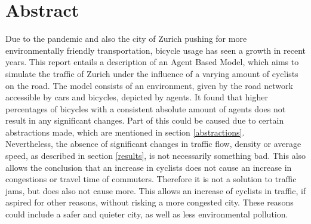 \section{Abstract}
Due to the pandemic and also the city of Zurich pushing for more environmentally friendly transportation, bicycle usage has seen a growth in recent years. This report entails a description of an Agent Based Model, which aims to simulate the traffic of Zurich under the influence of a varying amount of cyclists on the road. The model consists of an environment, given by the road network accessible by cars and bicycles, depicted by agents. It found that higher percentages of bicycles with a consistent absolute amount of agents does not result in any significant changes. Part of this could be caused due to certain abstractions made, which are mentioned in section \ref{abstractions}.\\
Nevertheless, the absence of significant changes in traffic flow, density or average speed, as described in section \ref{results}, is not necessarily something bad. This also allows the conclusion that an increase in cyclists does not cause an increase in congestions or travel time of commuters. Therefore it is not a solution to traffic jams, but does also not cause more. This allows an increase of cyclists in traffic, if aspired for other reasons, without risking a more congested city. These reasons could include a safer and quieter city, as well as less environmental pollution.